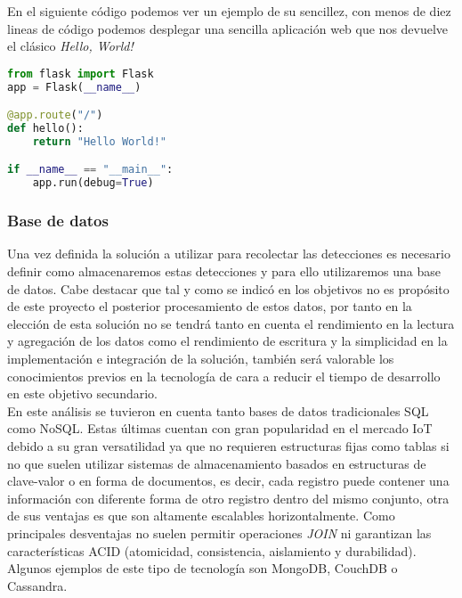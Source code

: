 \documentclass[../proyecto.tex]{subfiles}
\begin{document}
En el siguiente código podemos ver un ejemplo de su sencillez, con menos de diez lineas de código podemos desplegar una sencilla aplicación web que nos devuelve el clásico \textit{Hello, World!}\\

\begin{minipage}{\linewidth}
\begin{lstlisting}[language=Python, caption=Ejemplo de aplicación web básica con Flask, captionpos=b, frame=single]
from flask import Flask
app = Flask(__name__)

@app.route("/")
def hello():
    return "Hello World!"

if __name__ == "__main__":
    app.run(debug=True)
\end{lstlisting}
\end{minipage}

\subsubsection{Base de datos}

 Una vez definida la solución a utilizar para recolectar las detecciones es necesario definir como almacenaremos estas detecciones y para ello utilizaremos una base de datos. Cabe destacar que tal y como se indicó en los objetivos no es propósito de este proyecto el posterior procesamiento de estos datos, por tanto en la elección de esta solución no se tendrá tanto en cuenta el rendimiento en la lectura y agregación de los datos como el rendimiento de escritura y la simplicidad en la implementación e integración de la solución, también será valorable los conocimientos previos en la tecnología de cara a reducir el tiempo de desarrollo en este objetivo secundario.\\

En este análisis se tuvieron en cuenta tanto bases de datos tradicionales SQL como NoSQL. Estas últimas cuentan con gran popularidad en el mercado IoT debido a su gran versatilidad ya que no requieren estructuras fijas como tablas si no que suelen utilizar sistemas de almacenamiento basados en estructuras de clave-valor o en forma de documentos, es decir, cada registro puede contener una información con diferente forma de otro registro dentro del mismo conjunto, otra de sus ventajas es que son altamente escalables horizontalmente. Como principales desventajas no suelen permitir operaciones \textit{JOIN} ni garantizan las características ACID (atomicidad, consistencia, aislamiento y durabilidad). Algunos ejemplos de este tipo de tecnología son MongoDB, CouchDB o Cassandra.\\
\end{document}
